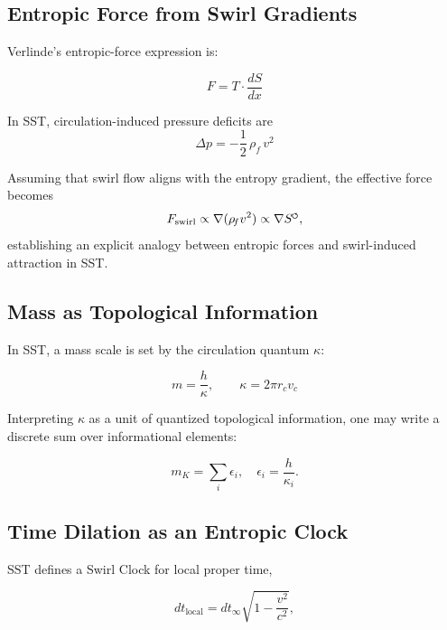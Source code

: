 \documentclass[11pt]{article}
\newcommand{\swirlarrow}{%
    \mathchoice{\mkern-2mu\scriptstyle\boldsymbol{\circlearrowleft}}%
    {\mkern-2mu\scriptstyle\boldsymbol{\circlearrowleft}}%
    {\mkern-2mu\scriptscriptstyle\boldsymbol{\circlearrowleft}}%
    {\mkern-2mu\scriptscriptstyle\boldsymbol{\circlearrowleft}}%
}
\newcommand{\rhof}{\rho_{\!f}}                           %
\begin{document}
    \subsection{Entropic Force from Swirl Gradients}
        Verlinde’s entropic-force expression is:

        \begin{equation}
            F = T \cdot \frac{dS}{dx}
        \end{equation}

        In SST, circulation-induced pressure deficits are
        \begin{equation}
            \Delta p = -\frac{1}{2} \,\rhof\, v^2
        \end{equation}

        Assuming that swirl flow aligns with the entropy gradient, the effective force becomes
        \begin{equation}
            F_\text{swirl} \propto \nabla (\rhof v^2) \propto \nabla S^{\swirlarrow},
        \end{equation}
        establishing an explicit analogy between entropic forces and swirl-induced attraction in SST.

    \subsection{Mass as Topological Information}
        In SST, a mass scale is set by the circulation quantum $\kappa$:

        \begin{equation}
            m = \frac{h}{\kappa}, \qquad \kappa = 2\pi r_c v_c
        \end{equation}

        Interpreting $\kappa$ as a unit of quantized topological information, one may write a discrete sum over informational elements:

        \begin{equation}
            m_K = \sum_i \epsilon_i, \quad \epsilon_i = \frac{h}{\kappa_i}.
        \end{equation}

    \subsection{Time Dilation as an Entropic Clock}
        SST defines a Swirl Clock for local proper time,

        \begin{equation}
            dt_\text{local} = dt_\infty \sqrt{1 - \frac{v^2}{c^2}},
        \end{equation}
\end{document}
